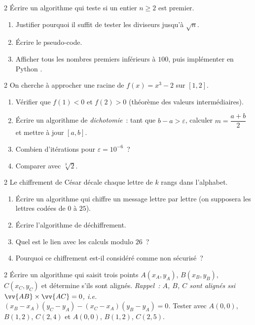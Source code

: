 \begin{exo}{2}
\'Ecrire un algorithme qui teste si un entier $n \geq 2$ est premier.
\begin{enumerate}
  \item Justifier pourquoi il suffit de tester les diviseurs jusqu'\`a $\sqrt{n}$.
  \item \'Ecrire le pseudo-code.
  \item Afficher tous les nombres premiers inf\'erieurs \`a $100$,
        puis impl\'ementer en Python \computer.
\end{enumerate}
\end{exo}

\begin{exo}{2}
On cherche \`a approcher une racine de $f(x) = x^3 - 2$ sur $[1, 2]$.
\begin{enumerate}
  \item V\'erifier que $f(1)<0$ et $f(2)>0$ (th\'eor\`eme des valeurs
        interm\'ediaires).
  \item \'Ecrire un algorithme de \emph{dichotomie}~: tant que $b-a > \varepsilon$,
        calculer $m=\dfrac{a+b}{2}$ et mettre \`a jour $[a,b]$.
  \item Combien d'it\'erations pour $\varepsilon = 10^{-6}$~?
  \item Comparer avec $\sqrt[3]{2}$.
\end{enumerate}
\end{exo}

\begin{exo}{2}
Le chiffrement de C\'esar d\'ecale chaque lettre de $k$ rangs dans l'alphabet.
\begin{enumerate}
  \item \'Ecrire un algorithme qui chiffre un message lettre par lettre
        (on supposera les lettres cod\'ees de $0$ \`a $25$).
  \item \'Ecrire l'algorithme de d\'echiffrement.
  \item Quel est le lien avec les calculs modulo $26$~?
  \item Pourquoi ce chiffrement est-il consid\'er\'e comme non s\'ecuris\'e~?
\end{enumerate}
\end{exo}

\begin{exo}{2}
\'Ecrire un algorithme qui saisit trois points $A(x_A,y_A)$,
$B(x_B,y_B)$, $C(x_C,y_C)$ et d\'etermine s'ils sont align\'es.
\emph{Rappel~: $A$, $B$, $C$ sont align\'es ssi
$\vv{AB}\times\vv{AC}=0$, i.e.\
$(x_B-x_A)(y_C-y_A)-(x_C-x_A)(y_B-y_A)=0$.}
Tester avec $A(0,0)$, $B(1,2)$, $C(2,4)$ et $A(0,0)$, $B(1,2)$, $C(2,5)$.
\end{exo}

